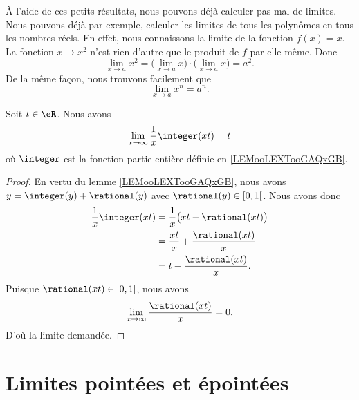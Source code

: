 À l'aide de ces petits résultats, nous pouvons déjà calculer pas mal de limites. Nous pouvons déjà par exemple, calculer les limites de tous les polynômes en tous les nombres réels. En effet, nous connaissons la limite de la fonction \( f(x)=x\). La fonction \( x\mapsto x^2\) n'est rien d'autre que le produit de \( f\) par elle-même. Donc
\[
	\lim_{x\to a}x^2=\big( \lim_{x\to a}x\big)\cdot\big( \lim_{x\to a}x \big)=a^2.
\]
De la même façon, nous trouvons facilement que
\begin{equation}
	\lim_{x\to a}x^n=a^n.
\end{equation}

\begin{lemma}       \label{LEMooLSJZooDauTkc}
	Soit \( t\in \eR\). Nous avons
	\begin{equation}
		\lim_{x\to \infty} \frac{1}{ x }\integer(xt)=t
	\end{equation}
	où \( \integer\) est la fonction partie entière définie en \ref{LEMooLEXTooGAQxGB}.
\end{lemma}

\begin{proof}
	En vertu du lemme \ref{LEMooLEXTooGAQxGB}, nous avons \( y=\integer(y)+\rational(y)\) avec \( \rational(y)\in \mathopen[ 0 , 1 \mathclose[\). Nous avons donc
	\begin{subequations}
		\begin{align}
			\frac{1}{ x }\integer(xt) & =\frac{1}{ x }\big( xt-\rational(xt) \big)    \\
			                          & =\frac{ xt }{ x }+\frac{ \rational(xt) }{ x } \\
			                          & =t+\frac{ \rational(xt) }{ x }.
		\end{align}
	\end{subequations}
	Puisque \( \rational(xt)\in \mathopen[ 0 , 1 \mathclose[\), nous avons
	\begin{equation}
		\lim_{x\to \infty} \frac{ \rational(xt) }{ x }=0.
	\end{equation}
	D'où la limite demandée.
\end{proof}


\section{Limites pointées et épointées}
\label{SECooNJSGooGSAtdV}

